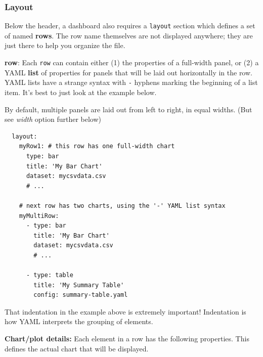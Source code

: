 \hypertarget{layout}{%
\subsubsection{Layout}\label{layout}}

Below the header, a dashboard also requires a \texttt{layout} section
which defines a set of named \textbf{rows}. The row name themselves are
not displayed anywhere; they are just there to help you organize the
file.

\noindent\textbf{row}: Each \texttt{row} can contain either (1) the properties of
a full-width panel, or (2) a YAML \textbf{list} of properties for panels
that will be laid out horizontally in the row. YAML lists have a strange
syntax with \texttt{-} hyphens marking the beginning of a list item.
It's best to just look at the example below.

By default, multiple panels are laid out from left to right, in equal widths. (But see \emph{width} option further below)

\begin{lstlisting}
  layout:
    myRow1: # this row has one full-width chart
      type: bar
      title: 'My Bar Chart'
      dataset: mycsvdata.csv
      # ...

    # next row has two charts, using the '-' YAML list syntax
    myMultiRow:
      - type: bar
        title: 'My Bar Chart'
        dataset: mycsvdata.csv
        # ...

      - type: table
        title: 'My Summary Table'
        config: summary-table.yaml
\end{lstlisting}

That indentation in the example above is extremely important!
Indentation is how YAML interprets the grouping of elements.

\noindent\textbf{Chart/plot details:} Each element in a row has the following
properties. This defines the actual chart that will be displayed.

